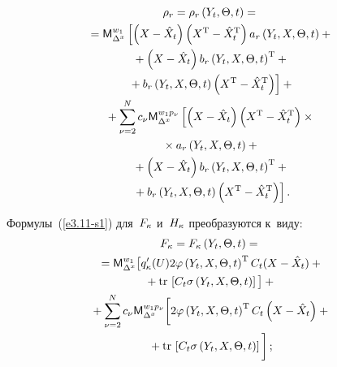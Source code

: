 \begin{multicols}{2}
\vspace*{-12pt}

\noindent
\begin{multline}
\rho_r = \rho_r \left(Y_t,\Theta, t\right) ={}\\
{}= {\sf M}_{\Delta^x}^{w_1} \left[ \left(X- {\hat X}_t\right) 
\left(X^{\mathrm{T}}-{\hat X}_t^{\mathrm{T}}\right) a_r \left(Y_t,X,\Theta,t\right) +{}\right.\\
{}+ \left(X-{\hat X}_t\right) b_r\left(Y_t,X,\Theta,t\right)^{\mathrm{T}} + {}\\
\left.{}+
b_r \left(Y_t,X,\Theta,t\right) \left(X^{\mathrm{T}}-{\hat X}_t^{\mathrm{T}}\right)
 \right] +{}\\
 {}+\sum\limits_{\nu=2}^N c_\nu {\sf M}_{\Delta^x}^{w_1p_\nu}\left[ 
 \left(X- {\hat X}_t\right) \left(X^{\mathrm{T}}-{\hat X}_t^{\mathrm{T}}\right) \times{}\right.\\
{}\times a_r \left(Y_t,X,\Theta,t\right) +{}\\
\left.{}+ \left(X-{\hat X}_t\right) b_r\left(Y_t,X,\Theta,t\right)^{\mathrm{T}} + {}\right.\\
\left.{}+
b_r \left(Y_t,X,\Theta,t\right) \left(X^{\mathrm{T}}-{\hat X}_t^{\mathrm{T}}\right) 
\right].
\label{e5.31-s1}
\end{multline}

Формулы~(\ref{e3.11-s1}) для~$F_\kappa$ и~$H_\kappa$ преобразуются к~виду:
\begin{multline}
F_\kappa= F_\kappa\left(Y_t,\Theta,t\right) = {}\\
{}=
{\sf M}_{\Delta^x}^{w_1} \big[ q_\kappa' (U) 2\varphi\left(Y_t, X,\Theta, t\right)^{\mathrm{T}} 
C_t(X-{\hat X}_t)+{}\\
{}+ \mathrm{tr}\, \left[ C_t\sigma \left(Y_t,X,\Theta,t\right)\right] \big]  + {}\\
{}+
\sum\limits_{\nu=2}^N c_\nu {\sf M}_{\Delta^x}^{w_1p_\nu} \bigg[ 
2\varphi\left(Y_t, X,\Theta, t\right)^{\mathrm{T}} C_t\left(X-{\hat X}_t\right)+{}\\
{}+ \mathrm{tr}\, \left[ C_t\sigma \left(Y_t,X,\Theta,t\right)\right]\bigg]\,;
\label{e5.32-s1}
\end{multline}

\vspace*{-12pt}


\end{multicols}
